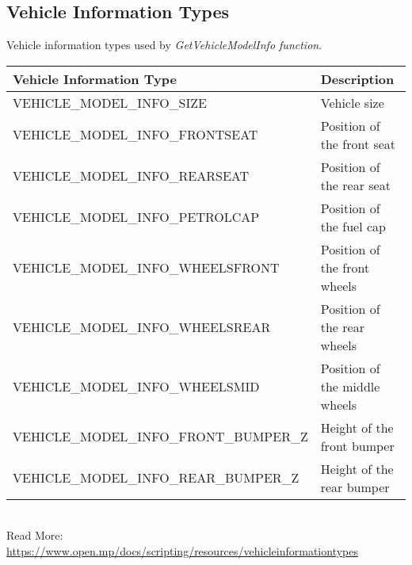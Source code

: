 \documentclass{article}
\begin{document}
\subsection{Vehicle Information Types}
Vehicle information types used by \textit{GetVehicleModelInfo function}.
\bigskip
\\\begin{tabular}{ |l|l| }
\hline
Vehicle Information Type & Description \\
\hline
VEHICLE\_MODEL\_INFO\_SIZE & Vehicle size \\ 
VEHICLE\_MODEL\_INFO\_FRONTSEAT & Position of the front seat \\ 
VEHICLE\_MODEL\_INFO\_REARSEAT & Position of the rear seat \\ 
VEHICLE\_MODEL\_INFO\_PETROLCAP & Position of the fuel cap \\ 
VEHICLE\_MODEL\_INFO\_WHEELSFRONT & Position of the front wheels \\ 
VEHICLE\_MODEL\_INFO\_WHEELSREAR & Position of the rear wheels \\ 
VEHICLE\_MODEL\_INFO\_WHEELSMID & Position of the middle wheels \\ 
VEHICLE\_MODEL\_INFO\_FRONT\_BUMPER\_Z & Height of the front bumper \\ 
VEHICLE\_MODEL\_INFO\_REAR\_BUMPER\_Z & Height of the rear bumper \\ 
\hline
\end{tabular}
\bigskip
\\Read More: \url{https://www.open.mp/docs/scripting/resources/vehicleinformationtypes}


\newpage
\end{document}
